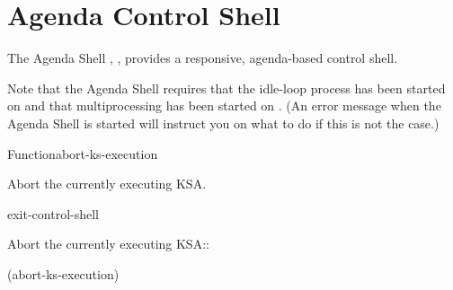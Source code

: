 \documentclass[10pt,twoside,english,pdftex]{article}
\begin{document}
\W\renewcommand{\subsubentities}{}

\T\markright{}%
\T\pagestyle{plain}
\T\cleardoublepage
\W{}
\T\pagestyle{fancy}
\T\thispagestyle{fancybottom}
\T\global\def\fnlastname{ }%
\T\renewcommand{\headrulewidth}{0pt}
\section{Agenda Control Shell}

%
%
%
The Agenda Shell , , provides a
responsive, agenda-based control shell.

Note that the Agenda Shell requires that the idle-loop process has been
started on  and that
multiprocessing has been started on
.  (An error message when the
Agenda Shell is started will instruct you on what to do if this is not the
case.)

\W\entities
\T\clearpage
\T\renewcommand{\headrulewidth}{0.01pt}


\begin{functiondoc}{Function}{abort-ks-execution}{\noargs}
%

\fnsyntax

\fnpurpose Abort the currently executing KSA.

\fnpackage {}

\fnmodule {}

\begin{alsos}{exit-control-shell}
\end{alsos}

\fnexample
Abort the currently executing KSA::
%
\W\supp
\begin{example}
  (abort-ks-execution)
\end{example}

\end{functiondoc}

\end{document}
